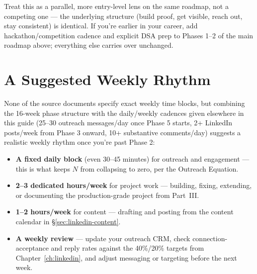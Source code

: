 \begin{keytakeaway}
Treat this as a parallel, more entry-level lens on the same roadmap, not a competing one — the underlying
structure (build proof, get visible, reach out, stay consistent) is identical. If you're earlier in your career,
add hackathon/competition cadence and explicit DSA prep to Phases 1--2 of the main roadmap above; everything else
carries over unchanged.
\end{keytakeaway}

\section{A Suggested Weekly Rhythm}

None of the source documents specify exact weekly time blocks, but combining the 16-week phase structure with the
daily/weekly cadences given elsewhere in this guide (25--30 outreach messages/day once Phase 5 starts, 2+
LinkedIn posts/week from Phase 3 onward, 10+ substantive comments/day) suggests a realistic weekly rhythm once
you're past Phase 2:

\begin{itemize}
  \item \textbf{A fixed daily block} (even 30--45 minutes) for outreach and engagement --- this is what keeps $N$
  from collapsing to zero, per the Outreach Equation.
  \item \textbf{2--3 dedicated hours/week} for project work --- building, fixing, extending, or documenting the
  production-grade project from Part~III.
  \item \textbf{1--2 hours/week} for content --- drafting and posting from the content calendar in
  \S\ref{sec:linkedin-content}.
  \item \textbf{A weekly review} --- update your outreach CRM, check connection-acceptance and reply rates against
  the 40\%/20\% targets from Chapter~\ref{ch:linkedin}, and adjust messaging or targeting before the next week.
\end{itemize}

